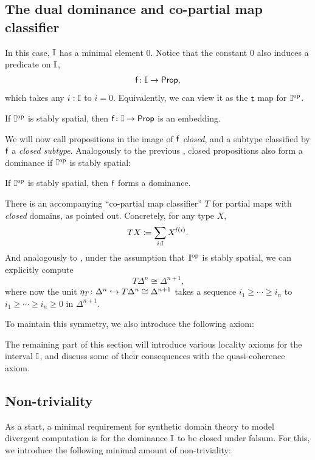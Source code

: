 \subsection{The dual dominance and co-partial map classifier}
In this case, $\mathbb{I}$ has a minimal element $0$. Notice that the constant $0$ also induces a predicate on $\mathbb{I}$,
\[ \isfsym\colon \I \to \pp\text{,} \]
which takes any $i : \mathbb{I}$ to $i = 0$. Equivalently, we can view it as the $\mathsf{t}$ map for $\mathbb{I}^{\mathrm{op}}$.

\begin{corollary}
  If $\mathbb{I}^{\mathrm{op}}$ is stably spatial, then $\mathsf{f}\colon \mathbb{I} \to \mathsf{Prop}$ is an embedding.
\end{corollary}

We will now call propositions in the image of $\mathsf{f}$ \emph{closed}, and a subtype classified by $\mathsf{f}$ a \emph{closed subtype}. Analogously to the previous , closed propositions also form a dominance if $\mathbb{I}^{\mathrm{op}}$ is stably spatial:

\begin{corollary}\label{cor:dualisdominance}
  If $\mathbb{I}^{\mathrm{op}}$ is stably spatial, then $\mathsf{f}$ forms a dominance.
\end{corollary}

There is an accompanying ``co-partial map classifier'' $T$ for partial maps with \emph{closed} domains, as \citet{hyland1990first} pointed out. Concretely, for any type $X$,
\[ T X \coloneq \sum_{i:\I} X^{\isf{i}}\text{.} \]
And analogously to , under the assumption that $\mathbb{I}^{\mathrm{op}}$ is stably spatial, we can explicitly compute 
\[ T\Delta^n \cong \Delta^{n+1}\text{,} \]
where now the unit $\eta_T \colon \Delta^n \hookrightarrow T\Delta^n \cong \Delta^{n+1}$ takes a sequence $i_1 \ge \cdots \ge i_n$ to $i_1 \ge \cdots \ge i_n \ge 0$ in $\Delta^{n+1}$. 

To maintain this symmetry, we also introduce the following axiom:

\PrintAxiomSQCID

The remaining part of this section will introduce various locality axioms for the interval $\mathbb{I}$, and discuss some of their consequences with the quasi-coherence axiom.

\subsection{Non-triviality}

As a start, a minimal requirement for synthetic domain theory to model divergent computation is for the dominance $\mathbb{I}$ to be closed under falsum. For this, we introduce the following minimal amount of non-triviality:

